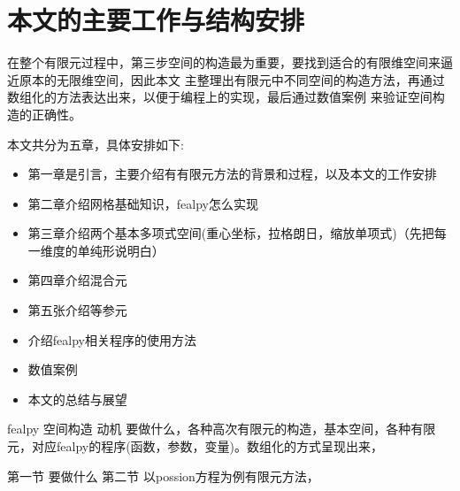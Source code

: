 \section{本文的主要工作与结构安排} 

在整个有限元过程中，第三步空间的构造最为重要，要找到适合的有限维空间来逼近原本的无限维空间，因此本文
主整理出有限元中不同空间的构造方法，再通过数组化的方法表达出来，以便于编程上的实现，最后通过数值案例
来验证空间构造的正确性。

本文共分为五章，具体安排如下:
\begin{itemize}
	\item 第一章是引言，主要介绍有有限元方法的背景和过程，以及本文的工作安排
	\item 第二章介绍网格基础知识，fealpy怎么实现
	\item 第三章介绍两个基本多项式空间(重心坐标，拉格朗日，缩放单项式)（先把每一维度的单纯形说明白）
	\item 第四章介绍混合元
	\item 第五张介绍等参元
	\item 介绍fealpy相关程序的使用方法
	\item 数值案例
	\item 本文的总结与展望
\end{itemize}
fealpy 空间构造  动机
要做什么，各种高次有限元的构造，基本空间，各种有限元，对应fealpy的程序(函数，参数，变量)。数组化的方式呈现出来，

第一节 要做什么
第二节 以possion方程为例有限元方法，
